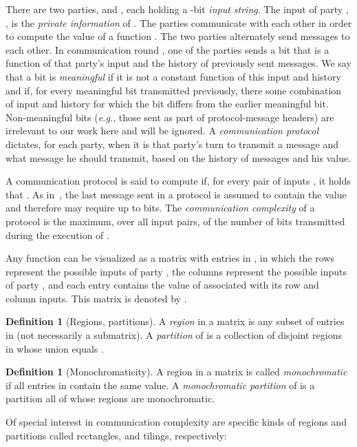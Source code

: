 \documentclass{article}
\theoremstyle{theorem}
\theoremstyle{definition}
\newtheorem{definition}[theorem]{Definition}
\theoremstyle{remark}
\begin{document}
There are two parties,  and , each holding a -bit
\emph{input string}. The input of party , , is
the \emph{private information} of . The parties communicate with
each other in order to compute the value of a function
. The two parties
alternately send messages to each other. In communication round , one of the parties sends a bit  that is a
function of that party's input and the history  of previously sent messages.  We say that a bit is \emph{meaningful} if it is not a constant function of this input and history and if, for every meaningful bit transmitted previously, there some combination of input and history for which the bit differs from the earlier meaningful bit.  Non-meaningful bits (\emph{e.g.}, those sent as part of protocol-message headers) are irrelevant to our work here and will be ignored.  A \emph{communication
protocol} dictates, for each party, when it is that party's turn to
transmit a message and what message he should transmit, based on the
history of messages and his value.

A communication protocol  is said to compute  if, for every
pair of inputs , it holds that . As
in~\cite{K92}, the last message sent in a protocol  is assumed to
contain the value  and therefore may require up to 
bits. The \emph{communication complexity} of a protocol  is the
maximum, over all input pairs, of the number of bits transmitted during the execution of .

Any function  can
be visualized as a  matrix with entries in
, in which the rows represent the possible inputs of
party , the columns represent the possible inputs of party ,
and each entry contains the value of  associated with its row and
column inputs. This matrix is denoted by .

\begin{definition}[Regions, partitions]
A \emph{region} in a matrix  is any subset of entries in  (not
necessarily a submatrix). A \emph{partition} of  is a collection
of disjoint regions in  whose union equals .
\end{definition}

\begin{definition}[Monochromaticity]
A region  in a matrix  is called \emph{monochromatic} if all
entries in  contain the same value. A \emph{monochromatic
partition} of  is a partition all of whose regions are
monochromatic.
\end{definition}

Of special interest in communication complexity are specific kinds
of regions and partitions called rectangles, and tilings,
respectively:
\end{document}
